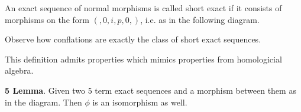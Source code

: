     \begin{remark}
        An exact sequence of normal morphisms is called short exact if it consists of morphisms on the form $(,0,i,p,0,)$, i.e. as in the following diagram.

        \begin{center}
        \end{center}

        Observe how conflations are exactly the class of short exact sequences.
    \end{remark}

    This definition admits properties which mimics properties from homologicial algebra.

    \begin{lemma}
        \textbf{5 Lemma}. Given two 5 term exact sequences and a morphism between them as in the diagram. Then $\phi$ is an isomorphism as well.
        \begin{center}
        \end{center}
    \end{lemma}



